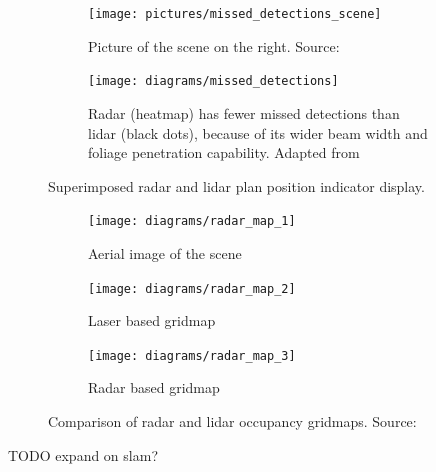 \begin{figure}[htbp]
    \centering
    \begin{subfigure}[t]{0.45\textwidth}
        \texttt{[image: pictures/missed\_detections\_scene]}
        \caption{Picture of the scene on the right. Source: \cite{Jose2010}}
        \label{fig:missed_detections_scene}
    \end{subfigure}
    \hfill
    \begin{subfigure}[t]{0.45\textwidth}
        \texttt{[image: diagrams/missed\_detections]}
        \caption{Radar (heatmap) has fewer missed detections than lidar (black dots), because of its wider beam width and foliage penetration capability. Adapted from \cite{Adams2015}}
        \label{fig:missed_detections}
    \end{subfigure}
    \caption{Superimposed radar and lidar plan position indicator display.}
\end{figure}
\begin{figure}[htbp]
    \centering
    \begin{subfigure}[t]{0.32\textwidth}
        \texttt{[image: diagrams/radar\_map\_1]}
        \caption{Aerial image of the scene}
        \label{fig:radar_map_1}
    \end{subfigure}
    \hfill
    \begin{subfigure}[t]{0.32\textwidth}
        \texttt{[image: diagrams/radar\_map\_2]}
        \caption{Laser based gridmap}
        \label{fig:radar_map_2}
    \end{subfigure}
    \hfill
    \begin{subfigure}[t]{0.32\textwidth}
        \texttt{[image: diagrams/radar\_map\_3]}
        \caption{Radar based gridmap}
        \label{fig:radar_map_3}
    \end{subfigure}
    \caption{Comparison of radar and lidar occupancy gridmaps. Source: \cite{Adams2015}}
    \label{fig:radar_map}
\end{figure}

TODO expand on slam?